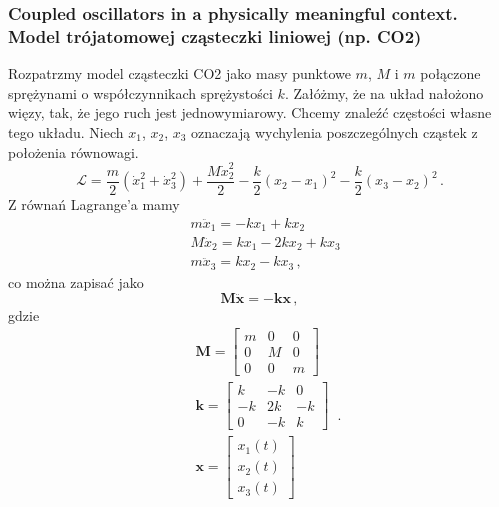 \documentclass[../main.tex]{subfiles}
\begin{document}
        \subsubsection*{Coupled oscillators in a physically meaningful context. Model trójatomowej cząsteczki liniowej (np. CO2)}
        Rozpatrzmy model cząsteczki CO2 jako masy punktowe \(m\), \(M\) i \(m\) połączone sprężynami
        o współczynnikach sprężystości \(k\). Załóżmy, że na układ nałożono więzy, tak, że jego ruch
        jest jednowymiarowy. Chcemy znaleźć częstości własne tego układu. Niech \(x_1\), \(x_2\),
        \(x_3\) oznaczają wychylenia poszczególnych cząstek z położenia równowagi.
        \begin{equation*}
            \mathcal{L}=\frac{m}{2}(\dot{x}_1^2+\dot{x}_3^2)+\frac{M\dot{x}_2^2}{2}-\frac{k}{2}(x_2-x_1)^2-\frac{k}{2}(x_3-x_2)^2\,.
        \end{equation*}
        Z równań Lagrange'a mamy
        \begin{equation*}
        \begin{split}
            &m\ddot x_1=-kx_1+kx_2\\
            &M\ddot x_2=kx_1-2kx_2+kx_3\\
            &m\ddot x_3=kx_2-kx_3\,,
        \end{split}
        \end{equation*}
        co można zapisać jako
        \begin{equation*}
            \mathbf{M}\ddot{\mathbf{x}}=-\mathbf{k}\mathbf{x}\,,
        \end{equation*}
        gdzie
        \begin{equation*}
        \begin{split}
            &\mathbf{M}=\begin{bmatrix}m&0&0\\0&M&0\\0&0&m\end{bmatrix}\\
            &\mathbf{k}=\begin{bmatrix}k&-k&0\\-k&2k&-k\\0&-k&k\end{bmatrix}\\
            &\mathbf{x}=\begin{bmatrix}x_1(t)\\x_2(t)\\x_3(t)\end{bmatrix}\\
        \end{split}\,.
        \end{equation*}
\end{document}
